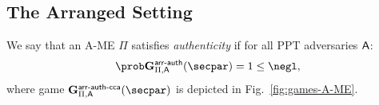 \subsection{The Arranged Setting}
\begin{definition}[Authenticity of A-ME]\label{def:SNISHeufsecurity}
    We say that an A-ME $\Pi$ satisfies {\em authenticity} if for all PPT adversaries $\mathsf{A}$:
    \[
        \Prob{\NISHeufgame{\arranged}_{\Pi,\adversary}(\secpar) = 1} \leq \negl,
    \]
    where game $\NISHeufgamecca{\arranged}_{\Pi, \adversary}(\secpar)$ is depicted in Fig.~\ref{fig:games-A-ME}.
\end{definition}